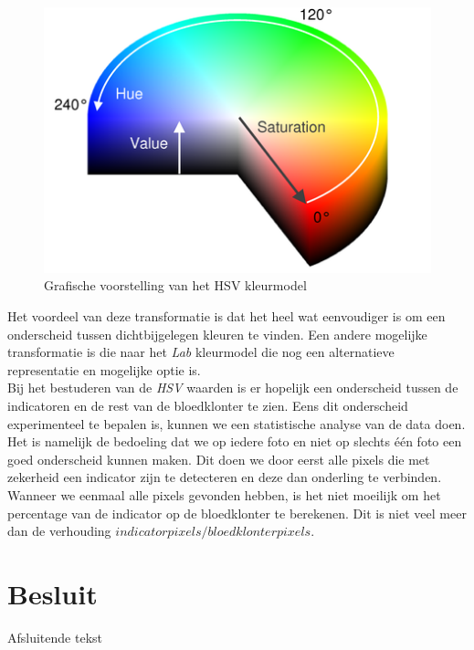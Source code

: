 \documentclass[a4paper,kulak]{kulakarticle}
\begin{document}
\begin{figure}[H]
	\centering
	\includegraphics[]{HSV_vb.png}
	
	\caption{Grafische voorstelling van het HSV kleurmodel}
	\label{figuur 3}
\end{figure}
Het voordeel van deze transformatie is dat het heel wat eenvoudiger is om een onderscheid tussen dichtbijgelegen kleuren te vinden. Een andere mogelijke transformatie is die naar het \textit{Lab} kleurmodel die nog een alternatieve representatie en mogelijke optie is.\\
Bij het bestuderen van de \textit{HSV} waarden is er hopelijk een onderscheid tussen de indicatoren en de rest van de bloedklonter te zien. Eens dit onderscheid experimenteel te bepalen is, kunnen we een statistische analyse van de data doen. Het is namelijk de bedoeling dat we op iedere foto en niet op slechts één foto een goed onderscheid kunnen maken. Dit doen we door eerst alle pixels die met zekerheid een indicator zijn te detecteren en deze dan onderling te verbinden. \\
Wanneer we eenmaal alle pixels gevonden hebben, is het niet moeilijk om het percentage van de indicator op de bloedklonter te berekenen. Dit is niet veel meer dan de verhouding \(indicatorpixels/bloedklonterpixels\).

\section*{Besluit}

Afsluitende tekst
\end{document}
